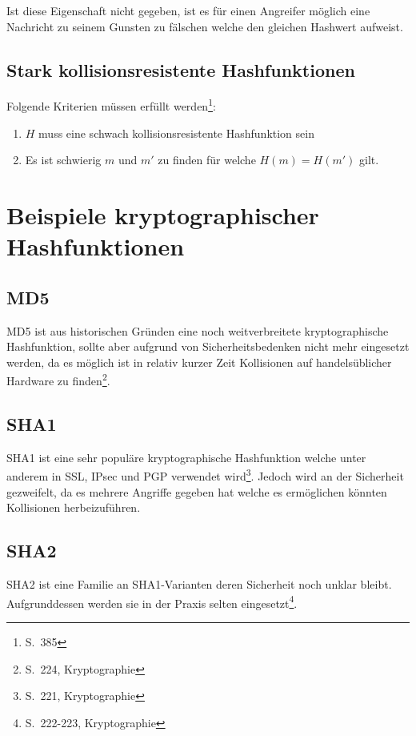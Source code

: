 Ist diese Eigenschaft nicht gegeben, ist es für einen Angreifer
möglich eine Nachricht zu seinem Gunsten zu fälschen welche den
gleichen Hashwert aufweist.

\subsection{Stark kollisionsresistente Hashfunktionen}

Folgende Kriterien müssen erfüllt werden\footnote{S.~385}:

\begin{enumerate}
\item $H$ muss eine schwach kollisionsresistente Hashfunktion sein
\item Es ist schwierig $m$ und $m'$ zu finden für welche $H(m) =
  H(m')$ gilt.
\end{enumerate}

\section{Beispiele kryptographischer Hashfunktionen}

\subsection{\ac{MD5}}

MD5 ist aus historischen Gründen eine noch weitverbreitete
kryptographische Hashfunktion, sollte aber aufgrund von
Sicherheitsbedenken nicht mehr eingesetzt werden, da es möglich ist in
relativ kurzer Zeit Kollisionen auf handelsüblicher Hardware zu
finden\footnote{S.~224, Kryptographie}.

\subsection{\ac{SHA1}}

SHA1 ist eine sehr populäre kryptographische Hashfunktion welche unter
anderem in SSL, IPsec und PGP verwendet wird\footnote{S.~221,
  Kryptographie}.  Jedoch wird an der Sicherheit gezweifelt, da es
mehrere Angriffe gegeben hat welche es ermöglichen könnten Kollisionen
herbeizuführen.

\subsection{\ac{SHA2}}

SHA2 ist eine Familie an SHA1-Varianten deren Sicherheit noch unklar
bleibt.  Aufgrunddessen werden sie in der Praxis selten
eingesetzt\footnote{S.~222-223, Kryptographie}.

